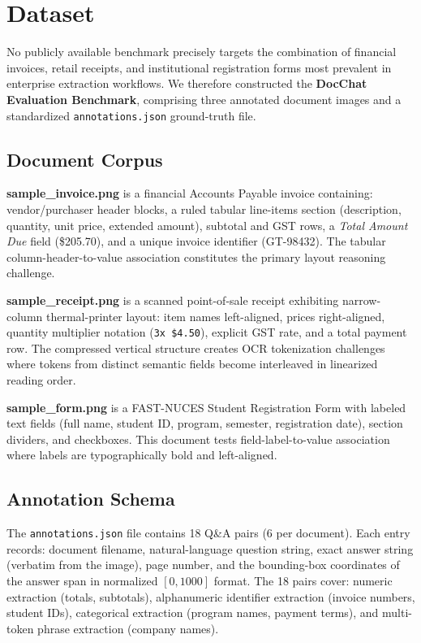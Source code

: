 \documentclass[conference]{IEEEtran}
\begin{document}
\section{Dataset}
\label{sec:dataset}

No publicly available benchmark precisely targets the combination of financial
invoices, retail receipts, and institutional registration forms most prevalent
in enterprise extraction workflows. We therefore constructed the
\textbf{DocChat Evaluation Benchmark}, comprising three annotated document
images and a standardized \texttt{annotations.json} ground-truth file.

\subsection{Document Corpus}

\textbf{sample\_invoice.png} is a financial Accounts Payable invoice
containing: vendor/purchaser header blocks, a ruled tabular line-items section
(description, quantity, unit price, extended amount), subtotal and GST rows, a
\emph{Total Amount Due} field (\$205.70), and a unique invoice identifier
(GT-98432). The tabular column-header-to-value association constitutes the
primary layout reasoning challenge.

\textbf{sample\_receipt.png} is a scanned point-of-sale receipt exhibiting
narrow-column thermal-printer layout: item names left-aligned, prices
right-aligned, quantity multiplier notation (\texttt{3x \$4.50}), explicit
GST rate, and a total payment row. The compressed vertical structure creates
OCR tokenization challenges where tokens from distinct semantic fields become
interleaved in linearized reading order.

\textbf{sample\_form.png} is a FAST-NUCES Student Registration Form with
labeled text fields (full name, student ID, program, semester, registration
date), section dividers, and checkboxes. This document tests field-label-to-value
association where labels are typographically bold and left-aligned.

\subsection{Annotation Schema}

The \texttt{annotations.json} file contains 18 Q\&A pairs (6 per document).
Each entry records: document filename, natural-language question string, exact
answer string (verbatim from the image), page number, and the bounding-box
coordinates of the answer span in normalized $[0, 1000]$ format. The 18 pairs
cover: numeric extraction (totals, subtotals), alphanumeric identifier
extraction (invoice numbers, student IDs), categorical extraction (program
names, payment terms), and multi-token phrase extraction (company names).
\end{document}
